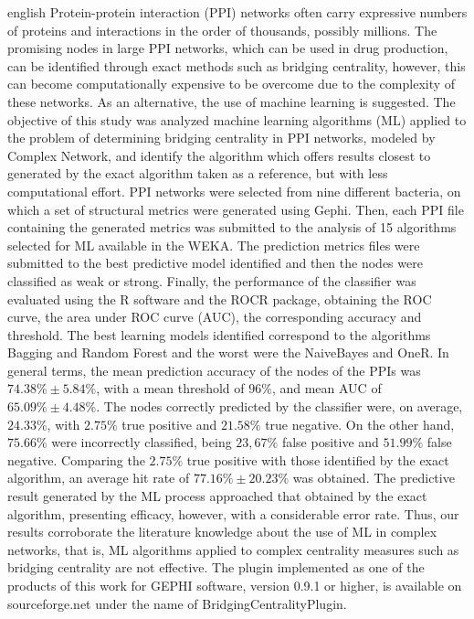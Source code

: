 \documentclass[
	12pt,				%
	twoside,			%
	a4paper,			%
	english,			%
	french,				%
	spanish,			%
	brazil				%
	]{abntex2}
\begin{document}

\begin{resumo}[Abstract]
 \begin{otherlanguage*}{english}
   Protein-protein interaction (PPI) networks often carry expressive
   numbers of proteins and interactions in the order of thousands, possibly
   millions. The promising nodes in large PPI networks, which can be used
   in drug production, can be identified through exact methods such as
   bridging centrality, however, this can become computationally expensive
   to be overcome due to the complexity of these networks. As an
   alternative, the use of machine learning is suggested. The objective of
   this study was analyzed machine learning algorithms (ML) applied to the
   problem of determining bridging centrality in PPI networks, modeled by
   Complex Network, and identify the algorithm which offers results closest
   to generated by the exact algorithm taken as a reference, but with less
   computational effort. PPI networks were selected from nine different
   bacteria, on which a set of structural metrics were generated using
   Gephi. Then, each PPI file containing the generated metrics was
   submitted to the analysis of 15 algorithms selected for ML available in
   the WEKA. The prediction metrics files were submitted to the best
   predictive model identified and then the nodes were classified as weak
   or strong. Finally, the performance of the classifier was evaluated
   using the R software and the ROCR package, obtaining the ROC curve, the
   area under ROC curve (AUC), the corresponding accuracy and threshold.
   The best learning models identified correspond to the algorithms Bagging
   and Random Forest and the worst were the NaiveBayes and OneR. In general
   terms, the mean prediction accuracy of the nodes of the PPIs was
   \(74.38\% \pm 5.84\%\), with a mean threshold of \(96\%\), and mean AUC
   of \(65.09\% \pm 4.48\%\). The nodes correctly predicted by the
   classifier were, on average, \(24.33\%\), with \(2.75\%\) true positive
   and \(21.58\%\) true negative. On the other hand, \(75.66\%\) were
   incorrectly classified, being \(23,67\%\) false positive and \(51.99\%\)
   false negative. Comparing the \(2.75\%\) true positive with those
   identified by the exact algorithm, an average hit rate of
   \(77.16\% \pm 20.23\%\) was obtained. The predictive result generated by
   the ML process approached that obtained by the exact algorithm,
   presenting efficacy, however, with a considerable error rate. Thus, our
   results corroborate the literature knowledge about the use of ML in
   complex networks, that is, ML algorithms applied to complex centrality
   measures such as bridging centrality are not effective. The plugin
   implemented as one of the products of this work for GEPHI software,
   version 0.9.1 or higher, is available on sourceforge.net under the name
   of BridgingCentralityPlugin.


\end{otherlanguage*}
\end{resumo}
\end{document}

